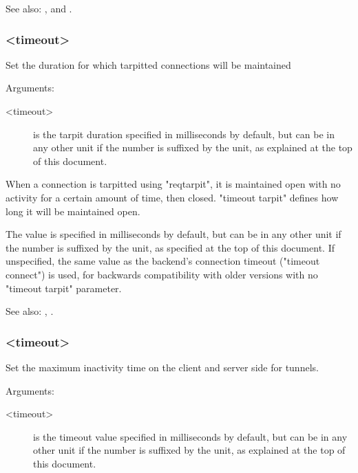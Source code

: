 {  See also: ,  and .

\subsubsection[timeout tarpit]{ <timeout>}

  Set the duration for which tarpitted connections will be maintained


  Arguments:
  \begin{description}
  \item[<timeout>] is the tarpit duration specified in milliseconds by default, but
              can be in any other unit if the number is suffixed by the unit,
              as explained at the top of this document.
  \end{description}

  When a connection is tarpitted using "reqtarpit", it is maintained open with
  no activity for a certain amount of time, then closed. "timeout tarpit"
  defines how long it will be maintained open.

  The value is specified in milliseconds by default, but can be in any other
  unit if the number is suffixed by the unit, as specified at the top of this
  document. If unspecified, the same value as the backend's connection timeout
  ("timeout connect") is used, for backwards compatibility with older versions
  with no "timeout tarpit" parameter.

  See also: , .

\subsubsection[timeout tunnel]{ <timeout>}

  Set the maximum inactivity time on the client and server side for tunnels.


  Arguments:
  \begin{description}
  \item[<timeout>] is the timeout value specified in milliseconds by default, but
              can be in any other unit if the number is suffixed by the unit,
              as explained at the top of this document.
  \end{description}

}
